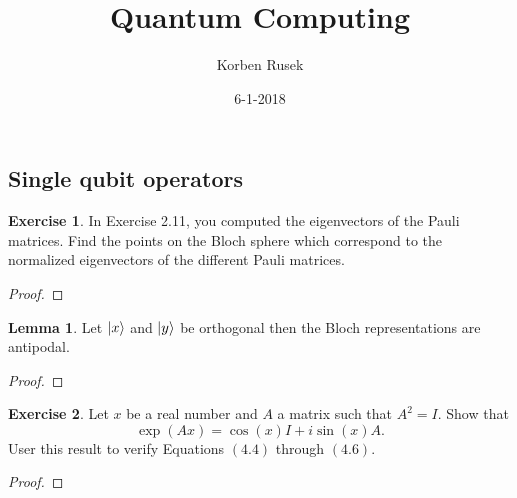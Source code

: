 \documentclass{article}
\author{Korben Rusek}
\title{Quantum Computing}
\date{6-1-2018}
\begin{document}
  \maketitle
  \newcommand{\gindex}[2]{|#1\!:\!#2|}
  \newcommand{\lcm}{\textrm{lcm}}
  \newcommand{\irr}{\textrm{irr}}
  \newcommand{\sylp}{$Syl_{p}$}
  \newcommand{\phnt}[1]{$\phantom{1}^{#1}$}
  \newcommand{\gen}[1]{\langle#1\rangle}
  \newcommand{\BN}{\mathbb{N}}
  \newcommand{\BZ}{\mathbb{Z}}
  \newcommand{\BQ}{\mathbb{Q}}
  \newcommand{\BR}{\mathbb{R}}
  \newcommand{\BC}{\mathbb{C}}
  \newcommand{\BF}{\mathbb{F}}
  \newcommand{\CF}{\mathcal{F}}
  \newcommand{\CQ}{\mathcal{Q}}
  \newcommand{\fa}{\mathfrak{a}}
  \newcommand{\fb}{\mathfrak{b}}
  \newcommand{\fp}{\mathfrak{p}}
  \newcommand{\fq}{\mathfrak{q}}
  \newcommand{\fm}{\mathfrak{m}}
  \newcommand{\FN}{\mathfrak{N}}
  \newcommand{\FR}{\mathfrak{R}}
  \newcommand{\set}[1]{\{#1\}}
  \newcommand{\trv}{\set{1}}
  \newcommand{\Aut}{\mathrm{Aut}}
  \newcommand{\End}{\mathrm{End}}
  \newcommand{\Ker}{\mathrm{Ker}}
  \newcommand{\chr}{\mathrm{char}}

  \theoremstyle{definition}
  \newtheorem{theorem}{Theorem}[section]
  \newtheorem{definition}[theorem]{Definition}
  \newtheorem{lemma}[theorem]{Lemma}
  \newtheorem{exercise}{Exercise}[section]

  \setcounter{section}{4}
  \setcounter{subsection}{1}

\subsection{Single qubit operators}

\begin{exercise}
  In Exercise 2.11, you computed the eigenvectors of the Pauli matrices. Find the points on the Bloch sphere which correspond to the normalized eigenvectors of the different Pauli matrices.
  \begin{proof}

  \end{proof}
\end{exercise}

\begin{lemma}
  Let $\ket{x}$ and $\ket{y}$ be orthogonal then the Bloch representations are antipodal. \label{lem:bloch}
  \begin{proof}

  \end{proof}
\end{lemma}

\begin{exercise}
  Let $x$ be a real number and $A$ a matrix such that $A^2=I$. Show that
  \[\exp(Ax)=\cos(x)I+i\sin(x)A.\]
  User this result to verify Equations $(4.4)$ through $(4.6)$.
  \begin{proof}

  \end{proof}
\end{exercise}
\end{document}
